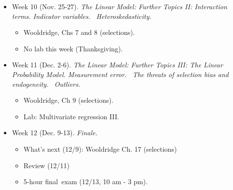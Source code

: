 \documentclass[11pt]{article}
\begin{document}
\begin{itemize}
\begin{itemize}
\item Week 10 (Nov. 25-27). \textit{The Linear Model: Further Topics II:
Interaction terms. Indicator variables. \ Heteroskedasticity.}

\begin{itemize}
\item Wooldridge, Chs 7 and 8 (selections).

\item No lab this week (Thanksgiving).\bigskip
\end{itemize}

\item Week 11 (Dec. 2-6). \textit{The Linear Model: Further Topics III: The
Linear Probability Model. Measurement error. \ The threats of selection bias
and endogeneity. \ Outliers.}

\begin{itemize}
\item Wooldridge, Ch 9 (selections).

\item Lab: Multivariate regression III.\bigskip
\end{itemize}

\item Week 12 (Dec. 9-13). \textit{Finale.}

\begin{itemize}
\item What's next (12/9): Wooldridge Ch. 17 (selections) \ 

\item Review (12/11)

\item 5-hour final\ exam (12/13, 10 am - 3 pm). \ 
\end{itemize}
\end{itemize}
\end{itemize}
\end{document}
